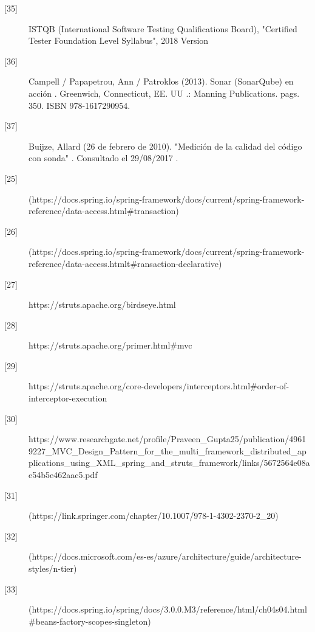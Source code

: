 \begin{description}
		\item[\hypertarget{b35}{[35]}] ISTQB (International Software Testing Qualifications Board), "Certified Tester
		Foundation Level Syllabus", 2018 Version 
		
		\item[\hypertarget{b36}{[36]}] Campell / Papapetrou, Ann / Patroklos (2013). Sonar (SonarQube) en acción . Greenwich, Connecticut, EE. UU .: Manning Publications. pags. 350. ISBN 978-1617290954.
		
		\item[\hypertarget{b37}{[37]}] Buijze, Allard (26 de febrero de 2010). "Medición de la calidad del código con sonda" . Consultado el 29/08/2017 .
				
		\item[\hypertarget{b25}{[25]}] (https://docs.spring.io/spring-framework/docs/current/spring-framework-reference/data-access.html\#transaction)
		
		\item[\hypertarget{b26}{[26]}] (https://docs.spring.io/spring-framework/docs/current/spring-framework-reference/data-access.htmlt\#ransaction-declarative)
		
		\item[\hypertarget{b27}{[27]}] https://struts.apache.org/birdseye.html 
		
		\item[\hypertarget{b28}{[28]}] https://struts.apache.org/primer.html\#mvc
		
		\item[\hypertarget{b29}{[29]}]
		https://struts.apache.org/core-developers/interceptors.html\#order-of-interceptor-execution
		
		\item[\hypertarget{b30}{[30]}] 	https://www.researchgate.net/profile/Praveen\_Gupta25/publication/49619227\_MVC\_Design\_Pattern\_for\_the\_multi\_framework\_distributed\_applications\_using\_XML\_spring\_and\_struts\_framework/links/5672564e08ae54b5e462aac5.pdf
		
		\item[\hypertarget{b31}{[31]}] (https://link.springer.com/chapter/10.1007/978-1-4302-2370-2\_20)
		\item[\hypertarget{b32}{[32]}] (https://docs.microsoft.com/es-es/azure/architecture/guide/architecture-styles/n-tier)
		\item[\hypertarget{b33}{[33]}](https://docs.spring.io/spring/docs/3.0.0.M3/reference/html/ch04s04.html\#beans-factory-scopes-singleton)

\end{description}